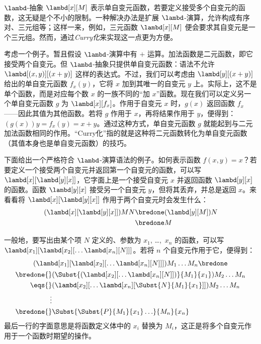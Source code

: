\documentclass[../../../include/open-logic-section]{subfiles}
\begin{document}

$\lambd$-抽象 $\lambd[x][M]$ 表示单自变元函数，若要定义接受多个自变元的函数，这无疑是个不小的限制。一种解决办法是扩展 $\lambd$-演算，允许构成有序对、三元组等；这样一来，例如，三元函数 $\lambd[x][M]$ 便会要求其自变元是一个三元组。然而，通过\emph{Curry化}来实现这一点更为方便。

考虑一个例子。暂且假设 $\lambd$-演算中有 $+$ 运算。加法函数是二元函数，即它接受两个自变元。但 $\lambd$-抽象只提供单自变元函数：语法不允许 $\lambd[(x,y)][(x+y)]$ 这样的表达式。不过，我们可以考虑由 $\lambd[y][(x+y)]$ 给出的单自变元函数 $f_x(y)$，它将 $x$ 加到其唯一的自变元 $y$ 上。实际上，这不是单个函数，而是对应每个数 $x$ 的一族不同的“加 $x$”函数。现在我们可以定义另一个单自变元函数 $g$ 为 $\lambd[x][f_x]$。作用于自变元 $x$ 时，$g(x)$ 返回函数 $f_x$——因此其值为其他函数。若将 $g$ 作用于 $x$，再将结果作用于 $y$，便得到：$(g(x))y = f_x(y) =
x+y$。通过这种方式，单自变元函数 $g$ 就能起到与二元加法函数相同的作用。“Curry化”指的就是这种将二元函数转化为单自变元函数（其值本身也是单自变元函数）的技巧。

下面给出一个严格符合 $\lambd$-演算语法的例子。如何表示函数 $f(x,y) = x$？若要定义一个接受两个自变元并返回第一个自变元的函数，可以写 $\lambd[x][\lambd[y][x]]$，它字面上是一个接受自变元 $x$ 并返回函数 $\lambd[y][x]$ 的函数。函数 $\lambd[y][x]$ 接受另一个自变元 $y$，但将其丢弃，并总是返回 $x$。来看看将 $\lambd[x][\lambd[y][x]]$ 作用于两个自变元时会发生什么：
\begin{align*}
  (\lambd[x][\lambd[y][x]])MN
  \bredone & (\lambd[y][M])N \\
  \bredone & M
\end{align*}

一般地，要写出由某个项 $N$ 定义的、参数为 $x_1$, \dots,~$x_n$ 的函数，可以写 $\lambd[x_1][\lambd[x_2][\ldots\lambd[x_n][N]]]$。若将 $n$ 个自变元作用于它，便得到：
\begin{multline*}
  (\lambd[x_1][\lambd[x_2][\ldots\lambd[x_n][N]]]) M_1 \dots M_n \bredone\\
  \begin{aligned}
  \bredone {} & (\Subst{(\lambd[x_2][\ldots\lambd[x_n][N]])}{M_1}{x_1}) M_2
  \dots M_n\\
   \eqs {} & (\lambd[x_2][\ldots\lambd[x_n][\Subst{N}{M_1}{x_1}]]) M_2
            \dots M_n \\
  \vdots & \\
  \bredone {} &\Subst{\Subst{P}{M_1}{x_1}\ldots}{M_n}{x_n}
  \end{aligned}
\end{multline*}
最后一行的字面意思是将函数定义体中的 $x_i$ 替换为 $M_i$，这正是将多个自变元作用于一个函数时期望的操作。
\end{document}
